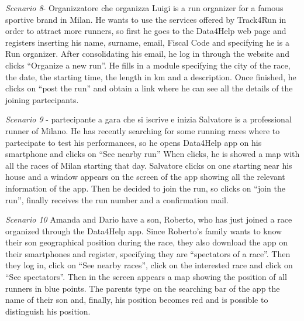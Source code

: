 \noindent \emph{Scenario 8}- Organizzatore che organizza
Luigi is a run organizer for a famous sportive brand in Milan. He wants to use the services offered by Track4Run in order to attract more runners, so first he goes to the Data4Help web page and registers inserting his name, surname, email, Fiscal Code and specifying he is a Run organizer. After consolidating his email, he log in through the website and clicks “Organize a new run”. He fills in a module specifying the city of the race, the date, the starting time, the length in km and a description. Once finished, he clicks on “post the run” and obtain a link where he can see all the details of the joining partecipants.

\noindent \emph{Scenario 9} - partecipante a gara  che si iscrive e inizia
Salvatore is a professional runner of Milano.  He has recently searching for some running races where to partecipate to test his performances, so he opens Data4Help app on his smartphone and clicks on “See nearby run”
When clicks, he is showed a map with all the races of Milan starting that day. Salvatore clicks on one starting near his house and a window appears on the screen of the app showing all the relevant information of the app. Then he decided to join the run, so clicks on “join the run”, finally receives the run number and a confirmation mail.

\noindent \emph{Scenario 10} Amanda and Dario have a son, Roberto, who has just joined a race organized through the Data4Help app. Since Roberto’s family wants to know their son geographical position during the race, they also download the app on their smartphones and register, specifying they are “spectators of a race”. Then they log in, click on “See nearby races”, click on the interested race and click on “See spectators”. Then in the screen appears a map showing the position of all runners in blue points. The parents type on the searching bar of the app the name of their son and, finally, his position becomes red and is possible to distinguish his position.
